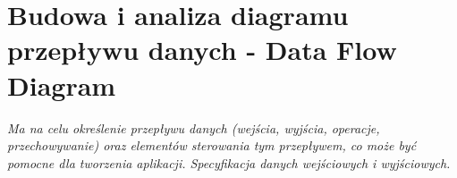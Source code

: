 \section{Budowa i analiza diagramu przepływu danych - Data Flow Diagram }
\textit{Ma na celu określenie przepływu danych (wejścia, wyjścia, operacje, przechowywanie) oraz
elementów sterowania tym przepływem, co może być pomocne dla tworzenia aplikacji.
Specyfikacja danych wejściowych i wyjściowych.}
